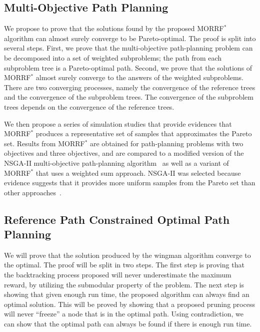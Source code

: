 \documentclass[phd]{byuprop}
\begin{document}
\subsection{Multi-Objective Path Planning}
\label{sec:validation:multi_objective_path_planning}

We propose to prove that the solutions found by the proposed MORRF$^{*}$ algorithm can almost surely converge to be Pareto-optimal.
The proof is split into several steps.
First, we prove that the multi-objective path-planning problem can be decomposed into a set of weighted subproblems;
the path from each subproblem tree is a Pareto-optimal path.
Second, we prove that the solutions of MORRF$^{*}$ almost surely converge to the answers of the weighted subproblems.
There are two converging processes, namely the convergence of the reference trees and the convergence of the subproblem trees.
The convergence of the subproblem trees depends on the convergence of the reference trees.

We then propose a series of simulation studies that provide evidences that MORRF$^{*}$ produces a representative set of samples that approximates the Pareto set.
Results from MORRF$^{*}$ are obtained for path-planning problems with two objectives and three objectives, and are compared to a modified version of the NSGA-II multi-objective path-planning algorithm~\cite{Ahmed2013} as well as a variant of MORRF$^{*}$ that uses a weighted sum approach.
NSGA-II was selected because evidence suggests that it provides more uniform samples from the Pareto set than other approaches~\cite{Deb2002}.

\subsection{Reference Path Constrained Optimal Path Planning}
\label{sec:validation:reference_path_constrained_optimal_path_planning}

We will prove that the solution produced by the wingman algorithm converge to the optimal.
The proof will be split in two steps.
The first step is proving that the backtracking process proposed will never underestimate the maximum reward, by utilizing the submodular property of the problem.
The next step is showing that given enough run time, the proposed algorithm can always find an optimal solution.
This will be proved by showing that a proposed pruning process will never ``freeze'' a node that is in the optimal path.
Using contradiction, we can show that the optimal path can always be found if there is enough run time.
\end{document}
